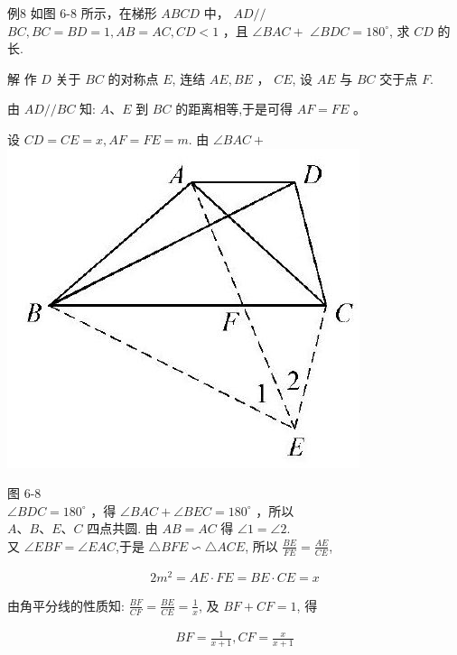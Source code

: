 \documentclass[10pt]{article}
\begin{document}
例8 如图 6-8 所示，在梯形 $A B C D$ 中， $A D / /$ $B C, B C=B D=1, A B=A C, C D<1$ ，且 $\angle B A C+$ $\angle B D C=180^{\circ}$, 求 $C D$ 的长.

解 作 $D$ 关于 $B C$ 的对称点 $E$, 连结 $A E, B E$ ， $C E$, 设 $A E$ 与 $B C$ 交于点 $F$.

由 $A D / / B C$ 知: $A 、 E$ 到 $B C$ 的距离相等,于是可得 $A F=F E$ 。

设 $C D=C E=x, A F=F E=m$. 由 $\angle B A C+$\\
\includegraphics[max width=\textwidth, center]{2024_10_30_66b8e5e701da2093c133g-047}

图 6-8\\
$\angle B D C=180^{\circ}$ ，得 $\angle B A C+\angle B E C=180^{\circ}$ ，所以\\
$A 、 B 、 E 、 C$ 四点共圆. 由 $A B=A C$ 得 $\angle 1=\angle 2$.\\
又 $\angle E B F=\angle E A C$,于是 $\triangle B F E \backsim \triangle A C E$, 所以 $\frac{B E}{F E}=\frac{A E}{C E}$,

\begin{align*}
2 m^{2}=A E \cdot F E=B E \cdot C E=x \tag{1}
\end{align*}

由角平分线的性质知: $\frac{B F}{C F}=\frac{B E}{C E}=\frac{1}{x}$, 及 $B F+C F=1$, 得

\begin{align*}
B F=\frac{1}{x+1}, C F=\frac{x}{x+1} \tag{2}
\end{align*}
\end{document}
